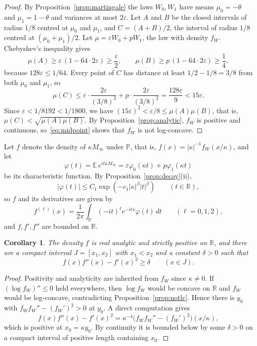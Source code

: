 \documentclass{amsart}
\newtheorem{corollary}[theorem]{Corollary}
\theoremstyle{definition}
\theoremstyle{remark}
\numberwithin{equation}{section}
\newcommand{\eps}{\varepsilon}
\newcommand{\E}{\mathbb{E}}
\newcommand{\Prob}{\mathbb{P}}
\newcommand{\R}{\mathbb{R}}
\newcommand{\abs}[1]{\lvert #1\rvert}
\begin{document}
\begin{proof}
By Proposition~\ref{prop:martingale} the laws $W_0,W_1$ have means $\mu_0=-\theta$ and $\mu_1=1-\theta$ and variances at most $2\eps$. Let $A$ and $B$ be the closed intervals of radius $1/8$ centred at $\mu_0$ and $\mu_1$, and $C=(A+B)/2$, the interval of radius $1/8$ centred at $(\mu_0+\mu_1)/2$. Let $\mu=\eps W_0+pW_1$, the law with density $f_W$. Chebyshev's inequality gives
\[
\mu(A)\ge\eps\,(1-64\cdot2\eps)\ge\frac\eps2,\qquad \mu(B)\ge p\,(1-64\cdot2\eps)\ge\frac14,
\]
because $128\eps\le1/64$. Every point of $C$ has distance at least $1/2-1/8=3/8$ from both $\mu_0$ and $\mu_1$, so
\[
\mu(C)\le\eps\cdot\frac{2\eps}{(3/8)^2}+p\cdot\frac{2\eps}{(3/8)^2}=\frac{128\eps}{9}<15\eps .
\]
Since $\eps<1/8192<1/1800$, we have $(15\eps)^2<\eps/8\le\mu(A)\mu(B)$, that is, $\mu(C)<\sqrt{\mu(A)\mu(B)}$. By Proposition~\ref{prop:analytic}, $f_W$ is positive and continuous, so~\eqref{eq:midpoint} shows that $f_W$ is not log-concave.
\end{proof}

Let $f$ denote the density of $\kappa M_\infty$ under $\Prob$, that is, $f(x)=\abs\kappa^{-1}f_W(x/\kappa)$, and let
\begin{equation}\label{eq:phi}
\varphi(t)=\E\,e^{it\kappa M_\infty}=\eps\varphi_0(\kappa t)+p\varphi_1(\kappa t)
\end{equation}
be its characteristic function. By Proposition~\ref{prop:decay}(ii),
\begin{equation}\label{eq:phidecay}
\abs{\varphi(t)}\le C_1\exp(-c_1\abs\kappa^\beta\abs t^\beta)\qquad(t\in\R),
\end{equation}
so $f$ and its derivatives are given by
\begin{equation}\label{eq:fderiv}
f^{(\ell)}(x)=\frac1{2\pi}\int_\R(-it)^\ell e^{-itx}\varphi(t)\,dt\qquad(\ell=0,1,2),
\end{equation}
and $f,f',f''$ are bounded on $\R$.

\begin{corollary}\label{cor:J}
The density $f$ is real analytic and strictly positive on $\R$, and there are a compact interval $J=[x_1,x_2]$ with $x_1<x_2$ and a constant $\delta>0$ such that
\[
f(x)f''(x)-f'(x)^2\ge\delta\qquad(x\in J).
\]
\end{corollary}

\begin{proof}
Positivity and analyticity are inherited from $f_W$ since $\kappa\ne0$. If $(\log f_W)''\le0$ held everywhere, then $\log f_W$ would be concave on $\R$ and $f_W$ would be log-concave, contradicting Proposition~\ref{prop:notlc}. Hence there is $y_0$ with $f_Wf_W''-(f_W')^2>0$ at $y_0$. A direct computation gives
\[
f(x)f''(x)-f'(x)^2=\kappa^{-4}\bigl(f_Wf_W''-(f_W')^2\bigr)(x/\kappa),
\]
which is positive at $x_0=\kappa y_0$. By continuity it is bounded below by some $\delta>0$ on a compact interval of positive length containing $x_0$.
\end{proof}
\end{document}
